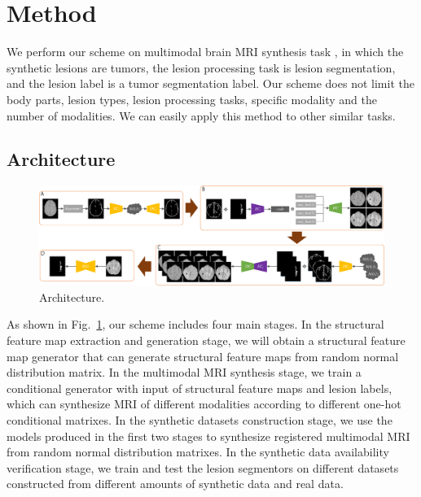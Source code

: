\documentclass[letterpaper]{article} %
\begin{document}
\section{Method}
\label{method}
We perform our scheme on multimodal brain MRI synthesis task , in which the synthetic lesions are tumors, the lesion processing task is lesion segmentation, and the lesion label is a tumor segmentation label. Our scheme does not limit the body parts, lesion types, lesion processing tasks, specific modality and the number of modalities. We can easily apply this method to other similar tasks.
\subsection{Architecture}
\begin{figure}[t]
	\centering
	\includegraphics[width=0.95\columnwidth]{figures/architecture}
	\caption{Architecture.}
	\label{architecture}
\end{figure}
As shown in Fig.~\ref{architecture}, our scheme includes four main stages. 
In the structural feature map extraction and generation stage, we will obtain a structural feature map generator that can generate structural feature maps from random normal distribution matrix. 
In the multimodal MRI synthesis stage, we train a conditional generator with input of structural feature maps and lesion labels, which can synthesize MRI of different modalities according to different one-hot conditional matrixes.
In the synthetic datasets construction stage, we use the models produced in the first two stages to synthesize registered multimodal MRI from random normal distribution matrixes. 
In the synthetic data availability verification stage, we train and test the lesion segmentors on different datasets constructed from different amounts of synthetic data and real data.
\end{document}

